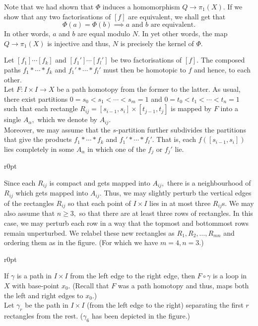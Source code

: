 \documentclass[12pt]{article}
\begin{document}
	Note that we had shown that $\Phi$ induces a homomorphism $Q \to \pi_1(X).$ If we show that any two factorisations of $[f]$ are equivalent, we shall get that 
	\begin{equation*} 
		\Phi(a) = \Phi(b) \implies a \text{ and } b \text{ are equivalent.}
	\end{equation*} 
	In other words, $a$ and $b$ are equal modulo $N.$ In yet other words, the map $Q \to \pi_1(X)$ is injective and thus, $N$ is precisely the kernel of $\Phi.$

	Let $[f_1]\cdots[f_k]$ and $[f_1']\cdots[f_l']$ be two factorisations of $[f].$ The composed paths $f_1*\cdots*f_k$ and $f_1'*\cdots*f_l'$ must then be homotopic to $f$ and hence, to each other.\\
	Let $F:I\times I \to X$ be a path homotopy from the former to the latter. As usual, there exist partitions $0 = s_0 < s_1 < \cdots < s_m = 1$ and $0 = t_0 < t_1 < \cdots < t_n = 1$ such that each rectangle $R_{ij} = [s_{i-1}, s_i]\times[t_{j-1}, t_j]$ is mapped by $F$ into a single $A_\alpha,$ which we denote by $A_{ij}.$\\
	Moreover, we may assume that the $s$-partition further subdivides the partitions that give the products $f_1*\cdots*f_k$ and $f_1'*\cdots*f_l'.$ That is, each $f([s_{i-1}, s_i])$ lies completely in some $A_\alpha$ in which one of the $f_j$ or $f_j'$ lie.

	\begin{wrapfigure}{r}{0pt}
		
	\end{wrapfigure}

	Since each $R_{ij}$ is compact and gets mapped into $A_{ij},$ there is a neighbourhood of $R_{ij}$ which gets mapped into $A_{ij}.$ Thus, we may slightly perturb the vertical edges of the rectangles $R_{ij}$ so that each point of $I\times I$ lies in at most three $R_{ij}$s. 
	We may also assume that $n \ge 3,$ so that there are at least three rows of rectangles. In this case, we may perturb each row in a way that the topmost and bottommost rows remain unperturbed. We relabel these new rectangles as $R_1,\allowbreak R_2,\allowbreak \ldots,\allowbreak R_{mn}$ and ordering them as in the figure. (For which we have $m = 4, n = 3.$)

	\begin{wrapfigure}{r}{0pt}
		
	\end{wrapfigure}

	If $\gamma$ is a path in $I\times I$ from the left edge to the right edge, then $F\circ\gamma$ is a loop in $X$ with base-point $x_0.$ (Recall that $F$ was a path homotopy and thus, maps both the left and right edges to $x_0.$)\\
	Let $\gamma_r$ be the path in $I \times I$ (from the left edge to the right) separating the first $r$ rectangles from the rest. ($\gamma_6$ has been depicted in the figure.)
\end{document}
